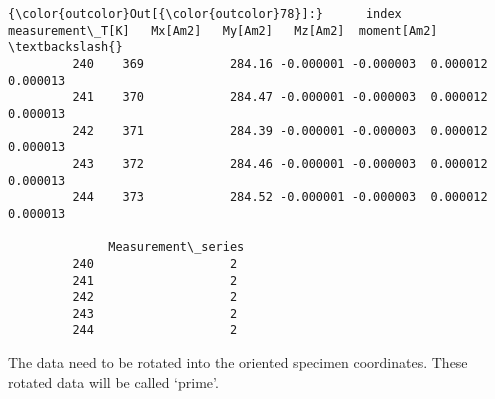 \documentclass{article}
\begin{document}
            \begin{Verbatim}[commandchars=\\\{\}]
{\color{outcolor}Out[{\color{outcolor}78}]:}      index  measurement\_T[K]   Mx[Am2]   My[Am2]   Mz[Am2]  moment[Am2]  \textbackslash{}
         240    369            284.16 -0.000001 -0.000003  0.000012     0.000013   
         241    370            284.47 -0.000001 -0.000003  0.000012     0.000013   
         242    371            284.39 -0.000001 -0.000003  0.000012     0.000013   
         243    372            284.46 -0.000001 -0.000003  0.000012     0.000013   
         244    373            284.52 -0.000001 -0.000003  0.000012     0.000013   
         
              Measurement\_series  
         240                   2  
         241                   2  
         242                   2  
         243                   2  
         244                   2  
\end{Verbatim}
        
    The data need to be rotated into the oriented specimen coordinates.
These rotated data will be called `prime'.
\end{document}
